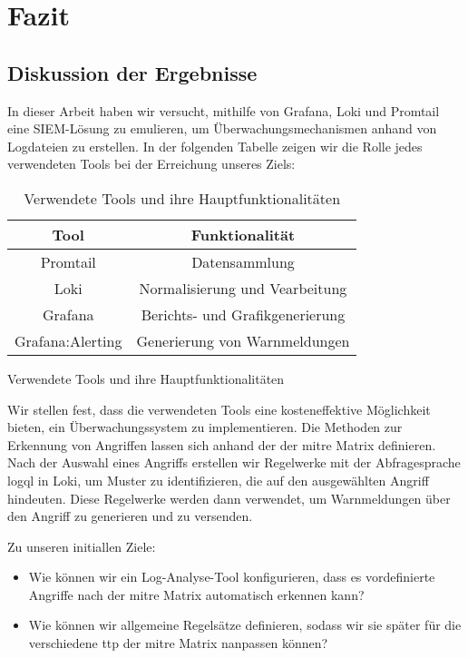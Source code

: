\section{Fazit}

\subsection{Diskussion der Ergebnisse}
In dieser Arbeit haben wir versucht, mithilfe von Grafana, Loki und Promtail eine \gls{SIEM}-Lösung zu emulieren, um Überwachungsmechanismen anhand von Logdateien zu erstellen. In der folgenden Tabelle zeigen wir die Rolle jedes verwendeten Tools bei der Erreichung unseres Ziels:

\begin{table}[h]
    \centering
    \begin{tabular}{|c|c|}
    \hline
    \textbf{Tool}    & \textbf{Funktionalität}         \\ \hline
    Promtail         & Datensammlung                   \\ \hline
    Loki             & Normalisierung und Vearbeitung  \\ \hline
    Grafana          & Berichts- und Grafikgenerierung \\ \hline
    Grafana:Alerting & Generierung von Warnmeldungen   \\ \hline
    \end{tabular}
    \caption{Verwendete Tools und ihre Hauptfunktionalitäten} 
    {Verwendete Tools und ihre Hauptfunktionalitäten}
    \label{tab:VerewendeteTools}
\end{table}

Wir stellen fest, dass die verwendeten Tools eine kosteneffektive Möglichkeit bieten, ein Überwachungssystem zu implementieren. Die Methoden zur Erkennung von Angriffen lassen sich anhand der  der \gls{mitre} Matrix definieren. Nach der Auswahl eines Angriffs erstellen wir Regelwerke mit der Abfragesprache \gls{logql} in Loki, um Muster zu identifizieren, die auf den ausgewählten Angriff hindeuten. Diese Regelwerke werden dann verwendet, um Warnmeldungen über den Angriff zu generieren und zu versenden.

Zu unseren initiallen Ziele:

{
\begin{itemize}[noitemsep]
   \item Wie können wir ein Log-Analyse-Tool konfigurieren, dass es vordefinierte Angriffe nach der \gls{mitre} Matrix automatisch erkennen kann? 
   \item Wie können wir allgemeine Regelsätze definieren, sodass wir sie später für die verschiedene \gls{ttp} der \gls{mitre} Matrix nanpassen können?
\end{itemize}
}

